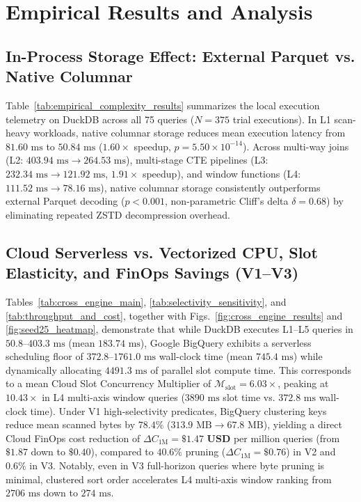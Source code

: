 \documentclass[10pt,a4paper]{article}
\begin{document}
\section{Empirical Results and Analysis}
\subsection{In-Process Storage Effect: External Parquet vs. Native Columnar}
Table~\ref{tab:empirical_complexity_results} summarizes the local execution telemetry on DuckDB across all 75 queries ($N=375$ trial executions). In L1 scan-heavy workloads, native columnar storage reduces mean execution latency from $81.60\text{ ms}$ to $50.84\text{ ms}$ ($1.60\times$ speedup, $p = 5.50 \times 10^{-14}$). Across multi-way joins (L2: $403.94\text{ ms} \rightarrow 264.53\text{ ms}$), multi-stage CTE pipelines (L3: $232.34\text{ ms} \rightarrow 121.92\text{ ms}$, $1.91\times$ speedup), and window functions (L4: $111.52\text{ ms} \rightarrow 78.16\text{ ms}$), native columnar storage consistently outperforms external Parquet decoding ($p < 0.001$, non-parametric Cliff's delta $\delta = 0.68$) by eliminating repeated ZSTD decompression overhead.

\subsection{Cloud Serverless vs. Vectorized CPU, Slot Elasticity, and FinOps Savings (V1--V3)}
Tables~\ref{tab:cross_engine_main}, \ref{tab:selectivity_sensitivity}, and \ref{tab:throughput_and_cost}, together with Figs.~\ref{fig:cross_engine_results} and \ref{fig:seed25_heatmap}, demonstrate that while DuckDB executes L1--L5 queries in $50.8\text{--}403.3\text{ ms}$ (mean $183.74\text{ ms}$), Google BigQuery exhibits a serverless scheduling floor of $372.8\text{--}1761.0\text{ ms}$ wall-clock time (mean $745.4\text{ ms}$) while dynamically allocating $4491.3\text{ ms}$ of parallel slot compute time. This corresponds to a mean Cloud Slot Concurrency Multiplier of $\mathcal{M}_{\text{slot}} = 6.03\times$, peaking at $10.43\times$ in L4 multi-axis window queries ($3890\text{ ms}$ slot time vs. $372.8\text{ ms}$ wall-clock time). Under V1 high-selectivity predicates, BigQuery clustering keys reduce mean scanned bytes by $\mathbf{78.4\%}$ ($313.9\text{ MB} \rightarrow 67.8\text{ MB}$), yielding a direct Cloud FinOps cost reduction of $\Delta C_{\text{1M}} = \mathbf{\$1.47\text{ USD}}$ per million queries (from $\$1.87$ down to $\$0.40$), compared to $40.6\%$ pruning ($\Delta C_{\text{1M}} = \$0.76$) in V2 and $0.6\%$ in V3. Notably, even in V3 full-horizon queries where byte pruning is minimal, clustered sort order accelerates L4 multi-axis window ranking from $2706\text{ ms}$ down to $274\text{ ms}$.
\end{document}
